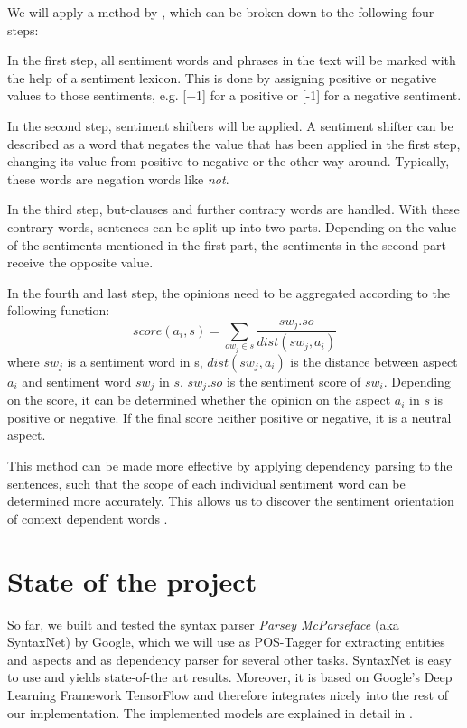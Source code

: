 \documentclass[10pt,a4paper]{article}
\begin{document}
		We will apply a method by \cite{Ding:2008:HLA:1341531.1341561}, which can be broken down to the following four steps: 
		
		In the first step, all sentiment words and phrases in the text will be marked with the help of a sentiment lexicon. This is done by assigning positive or negative values to those sentiments, e.g. [+1] for a positive or [-1] for a negative sentiment.
		
		In the second step, sentiment shifters will be applied. A sentiment shifter can be described as a word that negates the value that has been applied in the first step, changing its value from positive to negative or the other way around. Typically, these words are negation words like \textit{not}. 
		
		In the third step, but-clauses and further contrary words are handled. With these contrary words, sentences can be split up into two parts. Depending on the value of the sentiments mentioned in the first part, the sentiments in the second part receive the opposite value.
		
		In the fourth and last step, the opinions need to be aggregated according to the following function:
		\begin{displaymath}
			score(a_i,s) = \sum_{ow_j \in s} \frac{sw_j.so}{dist(sw_j,a_i)}
		\end{displaymath}
		where $sw_j$ is a sentiment word in s, $dist(sw_j, a_i)$ is the distance between aspect $a_i$ and sentiment word $sw_j$ in $s$. $sw_j.so$ is the sentiment score of $sw_i$. 
Depending on the score, it can be determined whether the opinion on the aspect $a_i$ in $s$ is positive or negative. If the final score neither positive or negative, it is a neutral aspect.
	
		This method can be made more effective by applying dependency parsing to the sentences, such that the scope of each individual sentiment word can be determined more accurately. This allows us to discover the sentiment orientation of context dependent words \cite{Liu12sentimentanalysis}.

	\section{State of the project}
	So far, we built and tested the syntax parser \textit{Parsey McParseface} (aka SyntaxNet) by Google, which we will use as POS-Tagger for extracting entities and aspects and as dependency parser for several other tasks. SyntaxNet is easy to use and yields state-of-the art results. Moreover, it is based on Google's Deep Learning Framework TensorFlow and therefore integrates nicely into the rest of our implementation. The implemented models are explained in detail in \cite{DBLP:journals/corr/AndorAWSPGPC16}.
	
\end{document}
